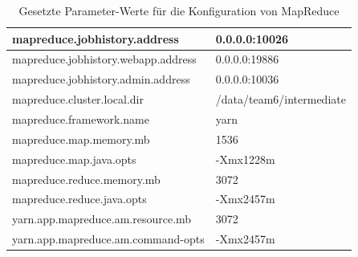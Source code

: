 \begin{table}
	\begin{tabularx}{\textwidth}{| X | X |} \hline
	mapreduce.jobhistory.address & 0.0.0.0:10026 \\ \hline
	mapreduce.jobhistory.webapp.address & 0.0.0.0:19886 \\ \hline
	mapreduce.jobhistory.admin.address & 0.0.0.0:10036 \\ \hline
	mapreduce.cluster.local.dir & /data/team6/intermediate \\ \hline
	mapreduce.framework.name & yarn \\ \hline
	mapreduce.map.memory.mb & 1536 \\ \hline
	mapreduce.map.java.opts & -Xmx1228m \\ \hline
	mapreduce.reduce.memory.mb & 3072 \\ \hline
	mapreduce.reduce.java.opts & -Xmx2457m \\ \hline
	yarn.app.mapreduce.am.resource.mb & 3072 \\ \hline
	yarn.app.mapreduce.am.command-opts & -Xmx2457m \\ \hline
	\end{tabularx}
	\caption{Gesetzte Parameter-Werte für die Konfiguration von MapReduce}
	\label{config:mapreduceValues}
\end{table}

